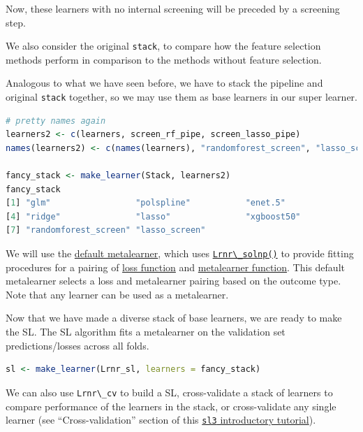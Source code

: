 \documentclass[12pt, krantz2,]{krantz}
\newcommand{\passthrough}[1]{#1}
\theoremstyle{definition}
\theoremstyle{definition}
\theoremstyle{definition}
\newcommand{\1}{\mathbbm{1}}
\begin{document}
Now, these learners with no internal screening will be preceded by a screening
step.

We also consider the original \passthrough{\lstinline!stack!}, to compare how the feature selection
methods perform in comparison to the methods without feature selection.

Analogous to what we have seen before, we have to stack the pipeline and
original \passthrough{\lstinline!stack!} together, so we may use them as base learners in our super
learner.

\begin{lstlisting}[language=R]
# pretty names again
learners2 <- c(learners, screen_rf_pipe, screen_lasso_pipe)
names(learners2) <- c(names(learners), "randomforest_screen", "lasso_screen")

fancy_stack <- make_learner(Stack, learners2)
fancy_stack
[1] "glm"                 "polspline"           "enet.5"             
[4] "ridge"               "lasso"               "xgboost50"          
[7] "randomforest_screen" "lasso_screen"       
\end{lstlisting}

We will use the \href{https://tlverse.org/sl3/reference/default_metalearner.html}{default
metalearner}, which
uses \href{https://tlverse.org/sl3/reference/Lrnr_solnp.html}{\passthrough{\lstinline!Lrnr\_solnp()!}} to
provide fitting procedures for a pairing of \href{https://tlverse.org/sl3/reference/loss_functions.html}{loss
function} and
\href{https://tlverse.org/sl3/reference/metalearners.html}{metalearner function}.
This default metalearner selects a loss and metalearner pairing based on the
outcome type. Note that any learner can be used as a metalearner.

Now that we have made a diverse stack of base learners, we are ready to make
the SL. The SL algorithm fits a metalearner on the validation set
predictions/losses across all folds.

\begin{lstlisting}[language=R]
sl <- make_learner(Lrnr_sl, learners = fancy_stack)
\end{lstlisting}

We can also use \passthrough{\lstinline!Lrnr\_cv!} to build a SL, cross-validate a stack of
learners to compare performance of the learners in the stack, or cross-validate
any single learner (see ``Cross-validation'' section of this \href{https://tlverse.org/sl3/articles/intro_sl3.html}{\passthrough{\lstinline!sl3!}
introductory tutorial}).
\end{document}
